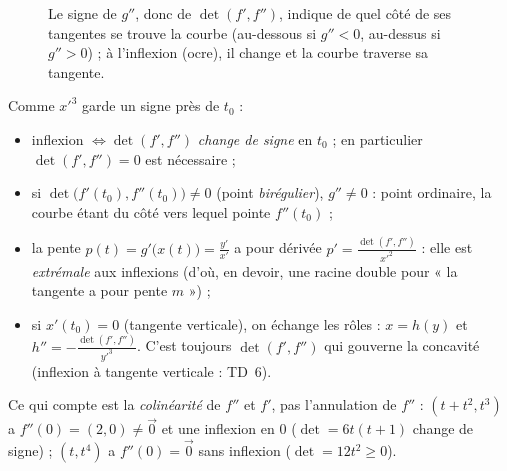 \documentclass[a4paper,11pt]{article}
\numberwithin{equation}{section}
\numberwithin{figure}{section}
\numberwithin{table}{section}
\theoremstyle{enonce}
\theoremstyle{exemple}
\theoremstyle{remarque}
\newcommand{\ve}[1]{\vec{#1}}
\begin{document}
\begin{figure}[H]
\centering
{}
\caption{Le signe de $g''$, donc de $\det(f',f'')$, indique de quel côté de ses tangentes se trouve la courbe (au-dessous
si $g''<0$, au-dessus si $g''>0$) ; à l'inflexion (ocre), il change et la courbe traverse sa tangente.}\label{fig:concavite}
\end{figure}

Comme $x'^3$ garde un signe près de $t_0$ :
\begin{itemize}
\item inflexion $\iff\det(f',f'')$ \emph{change de signe} en $t_0$ ; en particulier $\det(f',f'')=0$ est nécessaire ;
\item si $\det\big(f'(t_0),f''(t_0)\big)\neq0$ (point \emph{birégulier}), $g''\neq0$ : point ordinaire, la courbe étant du côté
      vers lequel pointe $f''(t_0)$ ;
\item la pente $p(t)=g'\big(x(t)\big)=\frac{y'}{x'}$ a pour dérivée $p'=\frac{\det(f',f'')}{x'^2}$ : elle est \emph{extrémale} aux
      inflexions (d'où, en devoir, une racine double pour « la tangente a pour pente $m$ ») ;
\item si $x'(t_0)=0$ (tangente verticale), on échange les rôles : $x=h(y)$ et $h''=-\frac{\det(f',f'')}{y'^3}$. C'est toujours
      $\det(f',f'')$ qui gouverne la concavité (inflexion à tangente verticale : TD~6).
\end{itemize}

\begin{attention}
Ce qui compte est la \emph{colinéarité} de $f''$ et $f'$, pas l'annulation de $f''$ : $(t+t^2,t^3)$ a $f''(0)=(2,0)\neq\ve0$ et une
inflexion en $0$ ($\det=6t(t+1)$ change de signe) ; $(t,t^4)$ a $f''(0)=\ve0$ sans inflexion ($\det=12t^2\geq0$).
\end{attention}
\end{document}

